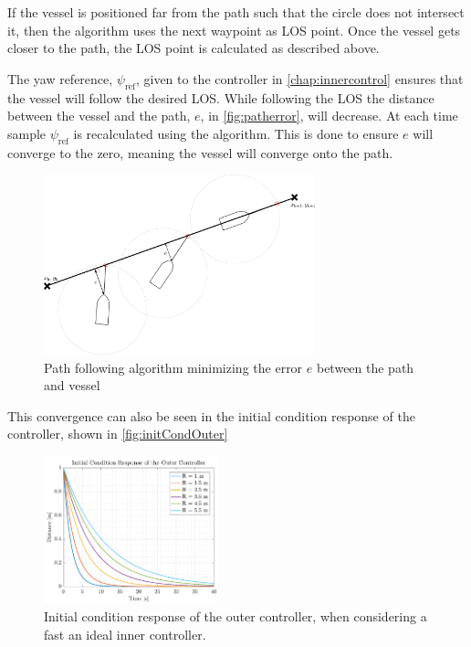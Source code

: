 If the vessel is positioned far from the path such that the circle does not intersect it, then the algorithm uses the next waypoint as LOS point. Once the vessel gets closer to the path, the LOS point is calculated as described above.

The yaw reference, $\psi_\mathrm{ref}$, given to the controller in \autoref{chap:innercontrol} ensures that the vessel will follow the desired LOS. While following the LOS the distance between the vessel and the path, $e$, in \autoref{fig:patherror}, will decrease. At each time sample $\psi_\mathrm{ref}$ is recalculated using the algorithm. This is done to ensure $e$ will converge to the zero, meaning the vessel will converge onto the path.
%
\begin{figure}[H]
	\includegraphics[width=0.7\textwidth]{figures/patherror}
	\caption{Path following algorithm minimizing the error $e$ between the path and vessel}
	\label{fig:patherror}
\end{figure}
%

This convergence can also be seen in the initial condition response of the controller, shown in \autoref{fig:initCondOuter}
%
\begin{figure}[H]
    \includegraphics[width=0.45\textwidth]{figures/initCondOuter}
    \caption{Initial condition response of the outer controller, when considering a fast an ideal inner controller.}
    \label{fig:initCondOuter}
\end{figure}

